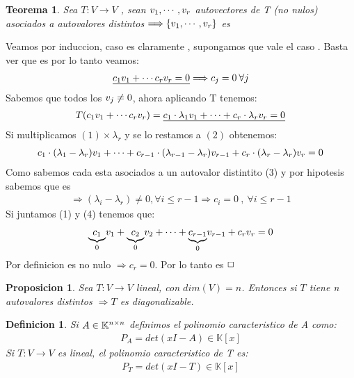 \documentclass[]{article}
\newtheorem{theorem}{Teorema}
\newtheorem{proposition}{Proposicion}[theorem]
\newtheorem{definition}{Definicion}
\newenvironment{proof}{\noindent{\bf Prueba:}}{$\hfill \Box$ \vspace{10pt}}
\newcommand{\K}{
    \mathbb{K}
}
\newcommand{\ida}{\Longrightarrow}
\begin{document}
\begin{theorem}
    Sea $T:V\to V$ \tl , sean $\text{$v_{1}$},\cdots,\text{$v_{r}$}$ autovectores de T (no nulos) asociados a autovalores distintos
    $\ida \conjunto{\vc{1},\cdots,\vc{r}}$ es \li
\end{theorem}
\begin{proof}
    Veamos por induccion, caso  es claramente \li , supongamos que vale el caso
    .
    Basta ver que  es \li por lo tanto veamos:
    \begin{align}
        \underline{c_1\vc{1} + \cdots c_{r}\vc{r}=0} \ida c_j=0 \: \forall j
    \end{align}
    Sabemos que todos los $\text{$v_{j}$}\neq0$, ahora aplicando T tenemos:
    \begin{align}
        \text{$T({c_1\text{$v_{1}$}+\cdots c_{r}\text{$v_{r}$}})$}=\underline{c_1\cdot\lambda_1\text{$v_{1}$} + \cdots+ c_{r}\cdot\lambda_{r}\text{$v_{r}$}=0}
    \end{align}    
    Si multiplicamos $(1) \times \lambda_{r}$ y se lo restamos a $(2)$ obtenemos:
    \begin{align}
        c_1\cdot(\lambda_1 - \lambda_{r} )\text{$v_{1}$} + \cdots
        +c_{r-1}\cdot(\lambda_{r-1} - \lambda_{r} )\text{$v_{r-1}$} + c_{r}\cdot (\lambda_{r}-\lambda_{r})\text{$v_{r}$}=0
    \end{align}
    Como sabemos cada  esta asociados a un autovalor distintito (3) y por hipotesis sabemos que
     es \li
    \begin{align}
        \ida (\lambda_i - \lambda_{r})\neq0 , \forall i\leq r-1 \ida c_i=0 \:,\:\forall i\leq r-1
    \end{align}
    Si juntamos (1) y (4) tenemos que:
    \begin{align*}
        \underset{0}{\underbrace{c_1}}\text{$v_{1}$} + \underset{0}{\underbrace{c_2}}\text{$v_{2}$} +
        \cdots + \underset{0}{\underbrace{c_{r-1}}}\text{$v_{r-1}$} + c_{r}\text{$v_{r}$}=0
    \end{align*}
    Por definicion  es no nulo $\ida c_r =0$. Por lo tanto   es \li
\end{proof}

\begin{proposition}
    Sea $T:V \to V$ lineal, con $dim(V)=n$. Entonces si $T$ tiene n autovalores distintos $\ida T$ es diagonalizable.
\end{proposition}

\begin{definition}
    Si $A \in \text{$\mathbb{K}^{n \times n}$}$ definimos el polinomio caracteristico de A como:
    \begin{align*}
        P_A=det(xI-A) \in \K[x]
    \end{align*}
    Si $T:V\to V$ es lineal, el polinomio caracteristico de T es:
    \begin{align*}
        P_T=det(xI-T) \in \K[x]
    \end{align*}
\end{definition}
\end{document}
